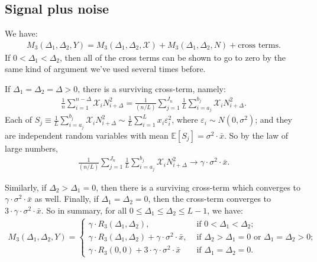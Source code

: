 \documentclass{article}
\theoremstyle{thm}
\theoremstyle{definition}
\newcommand{\E}{\mathbb{E}}
\newcommand{\ep}{\varepsilon}
\newcommand{\XX}{\mathcal{X}}
\newcommand{\1}{\mathbf{1}}
\begin{document}
%
%
%

\subsection{Signal plus noise}

We have:
%
\begin{align}
%
    M_3(\Delta_1,\Delta_2,Y) = M_3(\Delta_1,\Delta_2,\XX) + M_3(\Delta_1,\Delta_2,N)
        + \text{cross terms}.
%
\end{align}
%
If $0 < \Delta_1 < \Delta_2$, then all of the cross terms can be shown to go to zero by the same kind of argument we've used several times before.

If $\Delta_1 = \Delta_2 = \Delta > 0$, there is a surviving cross-term, namely:
%
\begin{align}
%
    \frac{1}{n} \sum_{i=1}^{n-\Delta} \XX_i N_{i+\Delta}^2
    = \frac{1}{(n/L)} \sum_{j=1}^{J_n} \frac{1}{L} \sum_{i=a_j}^{b_j} \XX_i N_{i+\Delta}^2.
%
\end{align}
%
Each of $S_j \equiv \frac{1}{L} \sum_{i=a_j}^{b_j} \XX_i N_{i+\Delta}^2 \sim \frac{1}{L} \sum_{i=1}^{L} x_i \ep_i^2$, where $\ep_i \sim N(0,\sigma^2)$; and they are independent random variables with mean $\E[S_j] = \sigma^2 \cdot \bar{x}$. So by the law of large numbers,
%
\begin{align}
%
    \frac{1}{(n/L)} \sum_{j=1}^{J_n} \frac{1}{L} \sum_{i=a_j}^{b_j} \XX_i N_{i+\Delta}^2
    \to \gamma \cdot \sigma^2 \cdot \bar{x}.
%
\end{align}

Similarly, if $\Delta_2 > \Delta_1 = 0$, then there is a surviving cross-term which converges to $\gamma \cdot \sigma^2 \cdot \bar{x}$ as well. Finally, if $\Delta_1 = \Delta_2 = 0$, then the cross-term converges to $3 \cdot \gamma  \cdot \sigma^2 \cdot \bar{x}$. So in summary, for all $0 \le \Delta_1 \le \Delta_2 \le L-1$, we have:
%
\begin{align}
%
    M_3(\Delta_1,\Delta_2,Y) = 
    \begin{cases}
        \gamma \cdot R_3(\Delta_1,\Delta_2), &\text{ if } 0 < \Delta_1 < \Delta_2; \\
        \gamma \cdot R_3(\Delta_1,\Delta_2) + \gamma \cdot \sigma^2 \cdot \bar{x},
                &\text{ if } \Delta_2 > \Delta_1 = 0 \text{ or } \Delta_1 = \Delta_2 > 0; \\
        \gamma \cdot R_3(0,0) + 3\cdot \gamma \cdot \sigma^2 \cdot \bar{x}
                &\text{ if } \Delta_1 = \Delta_2 = 0.
    \end{cases}
%
\end{align}
\end{document}
